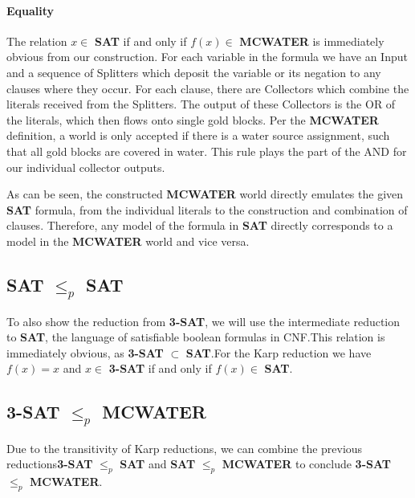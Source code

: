\pagebreak

\paragraph{Equality}
The relation $x \in$ \textbf{SAT} if and only if $f(x) \in$ \textbf{MCWATER} is immediately obvious from our construction. For each variable in the formula we have an Input and a sequence of Splitters which deposit the variable or its negation to any clauses where they occur. For each clause, there are Collectors which combine the literals received from the Splitters. The output of these Collectors is the OR of the literals, which then flows onto single gold blocks. Per the \textbf{MCWATER} definition, a world is only accepted if there is a water source assignment, such that all gold blocks are covered in water. This rule plays the part of the AND for our individual collector outputs.
\linebreak

\noindent As can be seen, the constructed \textbf{MCWATER} world directly emulates the given \textbf{SAT} formula, from the individual literals to the construction and combination of clauses. Therefore, any model of the formula in \textbf{SAT} directly corresponds to a model in the \textbf{MCWATER} world and vice versa.



\subsection{\textbf{SAT} $\leq_p$ SAT}
To also show the reduction from \textbf{3-SAT}, we will use the intermediate reduction to \textbf{SAT}, the language of satisfiable boolean formulas in CNF.\newline This relation is immediately obvious, as \textbf{3-SAT} $\subset$ \textbf{SAT}.\newline For the Karp reduction we have $f(x) = x$ and $x \in$ \textbf{3-SAT} if and only if $f(x) \in$ \textbf{SAT}.



\subsection{\textbf{3-SAT} $\leq_p$ \textbf{MCWATER}}
Due to the transitivity of Karp reductions, we can combine the previous reductions\newline \textbf{3-SAT} $\leq_p$ \textbf{SAT} and \textbf{SAT} $\leq_p$ \textbf{MCWATER} to conclude \textbf{3-SAT} $\leq_p$ \textbf{MCWATER}.



